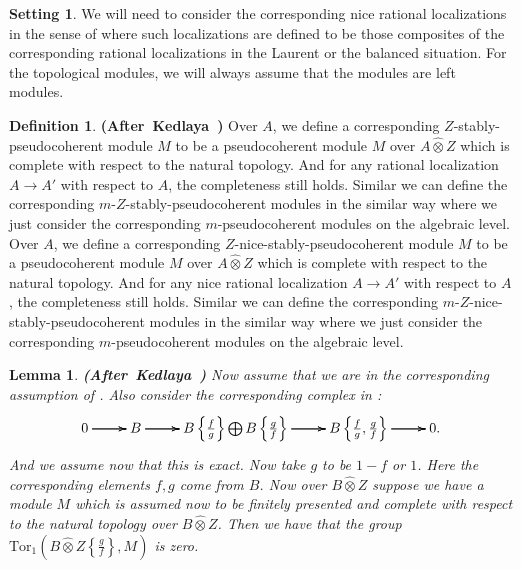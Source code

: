 \documentclass[12pt]{amsart}
\newtheorem{lemma}[theorem]{Lemma}
\theoremstyle{definition}
\newtheorem{definition}[theorem]{Definition}
\numberwithin{equation}{section}
\newtheorem{setting}[theorem]{Setting}
\begin{document}
\begin{setting}
We will need to consider the corresponding nice rational localizations in the sense of \cite[Definition 1.9.1]{Ked2} where such localizations are defined to be those composites of the corresponding rational localizations in the Laurent or the balanced situation. For the topological modules, we will always assume that the modules are left modules.
\end{setting}



\begin{definition}\mbox{\bf{(After Kedlaya \cite[Definition 1.9.1]{Ked2})}}
Over $A$, we define a corresponding $Z$-stably-pseudocoherent module $M$ to be a pseudocoherent module $M$ over $A\widehat{\otimes}Z$ which is complete with respect to the natural topology. And for any rational localization $A\rightarrow A'$ with respect to $A$, the completeness still holds. Similar we can define the corresponding $m$-$Z$-stably-pseudocoherent modules in the similar way where we just consider the corresponding $m$-pseudocoherent modules on the algebraic level. Over $A$, we define a corresponding $Z$-nice-stably-pseudocoherent module $M$ to be a pseudocoherent module $M$ over $A\widehat{\otimes}Z$ which is complete with respect to the natural topology. And for any nice rational localization $A\rightarrow A'$ with respect to $A$, the completeness still holds. Similar we can define the corresponding $m$-$Z$-nice-stably-pseudocoherent modules in the similar way where we just consider the corresponding $m$-pseudocoherent modules on the algebraic level.
\end{definition}


\begin{lemma} \mbox{\bf{(After Kedlaya \cite[Lemma 1.9.3]{Ked2})}} \label{lemma2.5}
Now assume that we are in the corresponding assumption of \cite[1.7.1]{Ked2}. Also consider the corresponding complex in \cite[1.6.15.1]{Ked2}:
\[
\xymatrix@C+0pc@R+0pc{
0 \ar[r] \ar[r] \ar[r] &B \ar[r] \ar[r] \ar[r] &B\left\{\frac{f}{g}\right\}\bigoplus B\left\{\frac{g}{f}\right\} \ar[r] \ar[r] \ar[r] &B\left\{\frac{f}{g},\frac{g}{f}\right\} \ar[r] \ar[r] \ar[r] &0.
}
\]	
And we assume now that this is exact. Now take $g$ to be $1-f$ or $1$. Here the corresponding elements $f,g$ come from $B$. Now over $B\widehat{\otimes}Z$ suppose we have a module $M$ which is assumed now to be finitely presented and complete with respect to the natural topology over $B\widehat{\otimes}Z$. Then we have that the group $\mathrm{Tor}_1(B\widehat{\otimes}Z\left\{\frac{g}{f}\right\},M)$ is zero. 	
\end{lemma}
\end{document}

